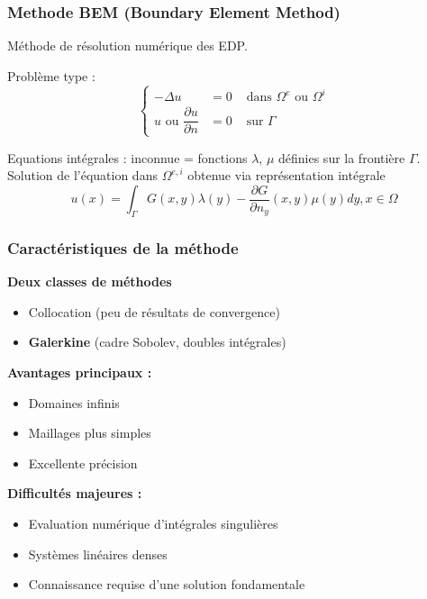 \documentclass[11pt]{beamer}
\begin{document}
	
	
	
	\setcounter{subsection}{1}
	\begin{frame}
		\frametitle{Methode BEM (Boundary Element Method)}
		Méthode de résolution numérique des EDP.
		\begin{minipage}{0.69\textwidth}
			Problème type : 
			\begin{equation*}
			\left\{
				\begin{aligned}
				-\Delta u &= 0 & \text{ dans } \Omega^e \text{ ou } \Omega^i\\
				u \text{ ou }\dfrac{\partial u}{\partial n} &= 0 & \text{ sur } \Gamma
				\end{aligned}
				\right.
			\end{equation*}
		\end{minipage}
		\begin{minipage}{0.29\textwidth}
			\begin{figure}
				\centering
			
			\end{figure}
		\end{minipage}
		\begin{minipage}{0.69\textwidth}
			Equations intégrales : inconnue = fonctions $\lambda$, $\mu$ définies sur la frontière $\Gamma$.\\
			Solution de l'équation dans $\Omega^{e,i}$ obtenue via représentation intégrale
			\[ u(x) = \int_{\Gamma}G(x,y) \lambda(y) -  \dfrac{\partial G}{\partial n_y}(x,y)\mu(y) dy, x \in \Omega\]
		\end{minipage}
		\begin{minipage}{0.29\textwidth}
		\begin{figure}
		\end{figure}
		\end{minipage}
	\end{frame}
	\begin{frame}
		\frametitle{Caractéristiques de la méthode}
		\textbf{Deux classes de méthodes}
		\begin{itemize}
			\item Collocation (peu de résultats de convergence)
			\item \textbf{Galerkine} (cadre Sobolev, doubles intégrales)
		\end{itemize}
		\textbf{Avantages principaux :}
		\begin{itemize}
			\item Domaines infinis
			\item Maillages plus simples 
			\item Excellente précision 
		\end{itemize}
		\textbf{Difficultés majeures :}
		\begin{itemize}
			\item Evaluation numérique d'intégrales singulières
			\item Systèmes linéaires denses
			\item Connaissance requise d'une solution fondamentale
		\end{itemize}
		
	\end{frame}
\end{document}
